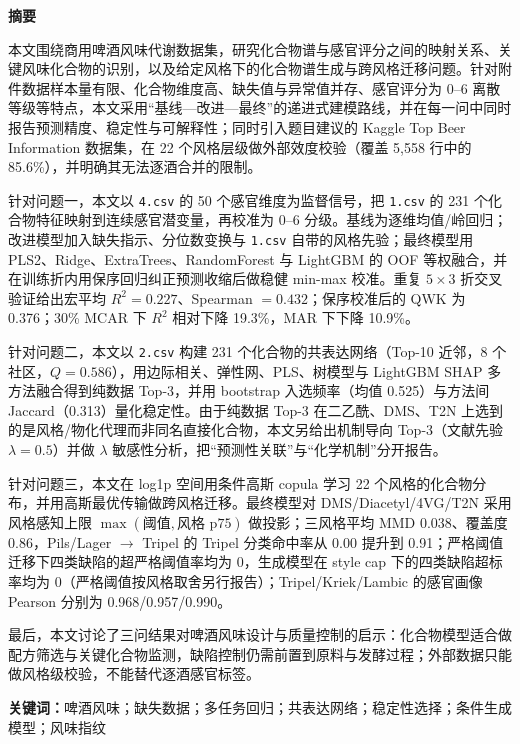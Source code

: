 
\begin{center}
  {\bfseries 摘\quad 要}
\end{center}
\vspace{0.4em}

本文围绕商用啤酒风味代谢数据集，研究化合物谱与感官评分之间的映射关系、关键风味化合物的识别，以及给定风格下的化合物谱生成与跨风格迁移问题。针对附件数据样本量有限、化合物维度高、缺失值与异常值并存、感官评分为 0--6 离散等级等特点，本文采用“基线—改进—最终”的递进式建模路线，并在每一问中同时报告预测精度、稳定性与可解释性；同时引入题目建议的 Kaggle Top Beer Information 数据集，在 22 个风格层级做外部效度校验（覆盖 5,558 行中的 85.6\%），并明确其无法逐酒合并的限制。

针对问题一，本文以 \texttt{4.csv} 的 50 个感官维度为监督信号，把 \texttt{1.csv} 的 231 个化合物特征映射到连续感官潜变量，再校准为 0--6 分级。基线为逐维均值/岭回归；改进模型加入缺失指示、分位数变换与 \texttt{1.csv} 自带的风格先验；最终模型用 PLS2、Ridge、ExtraTrees、RandomForest 与 LightGBM 的 OOF 等权融合，并在训练折内用保序回归纠正预测收缩后做稳健 min-max 校准。重复 $5\times3$ 折交叉验证给出宏平均 $R^2=0.227$、Spearman $=0.432$；保序校准后的 QWK 为 0.376；30\% MCAR 下 $R^2$ 相对下降 19.3\%，MAR 下下降 10.9\%。

针对问题二，本文以 \texttt{2.csv} 构建 231 个化合物的共表达网络（Top-10 近邻，8 个社区，$Q=0.586$），用边际相关、弹性网、PLS、树模型与 LightGBM SHAP 多方法融合得到纯数据 Top-3，并用 bootstrap 入选频率（均值 0.525）与方法间 Jaccard（0.313）量化稳定性。由于纯数据 Top-3 在二乙酰、DMS、T2N 上选到的是风格/物化代理而非同名直接化合物，本文另给出机制导向 Top-3（文献先验 $\lambda=0.5$）并做 $\lambda$ 敏感性分析，把“预测性关联”与“化学机制”分开报告。

针对问题三，本文在 log1p 空间用条件高斯 copula 学习 22 个风格的化合物分布，并用高斯最优传输做跨风格迁移。最终模型对 DMS/Diacetyl/4VG/T2N 采用风格感知上限 $\max(\text{阈值},\text{风格 p75})$ 做投影；三风格平均 MMD 0.038、覆盖度 0.86，Pils/Lager $\to$ Tripel 的 Tripel 分类命中率从 0.00 提升到 0.91；严格阈值迁移下四类缺陷的超严格阈值率均为 0，生成模型在 style cap 下的四类缺陷超标率均为 0（严格阈值按风格取舍另行报告）；Tripel/Kriek/Lambic 的感官画像 Pearson 分别为 0.968/0.957/0.990。

最后，本文讨论了三问结果对啤酒风味设计与质量控制的启示：化合物模型适合做配方筛选与关键化合物监测，缺陷控制仍需前置到原料与发酵过程；外部数据只能做风格级校验，不能替代逐酒感官标签。

\vspace{0.8em}
\noindent\textbf{关键词：}啤酒风味；缺失数据；多任务回归；共表达网络；稳定性选择；条件生成模型；风味指纹
